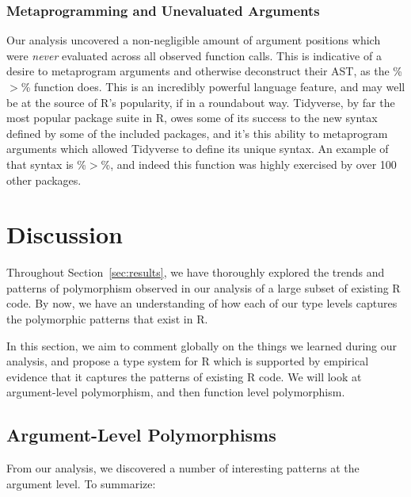 \documentclass[acmsmall,10pt,review,anonymous]{acmart}\settopmatter{printfolios=true,printccs=false,printacmref=false}
\begin{document}
%
%
%
%
\subsubsection{Metaprogramming and Unevaluated Arguments}

Our analysis uncovered a non-negligible amount of argument positions which were {\it never} evaluated across all observed function calls.
This is indicative of a desire to metaprogram arguments and otherwise deconstruct their AST, as the \%$>$\% function does.
This is an incredibly powerful language feature, and may well be at the source of R's popularity, if in a roundabout way.
Tidyverse, by far the most popular package suite in R, owes some of its success to the new syntax defined by some of the included packages, and it's this ability to metaprogram arguments which allowed Tidyverse to define its unique syntax.
An example of that syntax is \%$>$\%, and indeed this function was highly exercised by over 100 other packages.

%
%
%
%
%
\section{Discussion}

Throughout Section~\ref{sec:results}, we have thoroughly explored the trends and patterns of polymorphism observed in our analysis of a large subset of existing R code.
By now, we have an understanding of how each of our type levels captures the polymorphic patterns that exist in R.

In this section, we aim to comment globally on the things we learned during our analysis, and propose a type system for R which is supported by empirical evidence that it captures the patterns of existing R code.
We will look at argument-level polymorphism, and then function level polymorphism.

%
%
%
%
\subsection{Argument-Level Polymorphisms}

From our analysis, we discovered a number of interesting patterns at the argument level.
To summarize:
\end{document}

